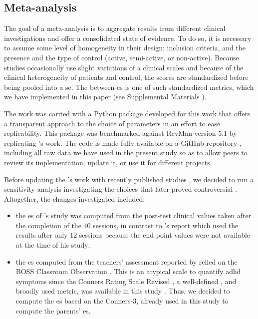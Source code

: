 \subsection{Meta-analysis}

The goal of a meta-analysis is to aggregate results from different clinical investigations and offer a 
consolidated state of evidence. To do so, it is necessary to assume 
some level of homogeneity in their design: inclusion criteria, and the presence and the type of control 
(active, semi-active, or non-active). Because studies occasionally 
use slight variations of a clinical scales and because of the clinical heterogeneity of patients and control, 
the scores are standardized before being pooled into a \gls{se}. The between-\gls{es} is one of such standardized metrics, 
which we have implemented in this paper (see Supplemental Materials \citep{Supplementalmaterial}). 

The work was carried with a Python package developed for this work that offers a transparent 
approach to the choice of parameters in an effort to ease replicability. This package was benchmarked against 
RevMan version 5.1 \citep[UK, London]{RevMan} by replicating \citet{Cortese2016}'s work. 
The code is made fully available on a GitHub repository \citep{Bussalb2018}, including all raw data we have used
in the present study so as to allow peers to review its implementation, update it, or use it for different projects. 
 
Before updating the \citet{Cortese2016}'s work with recently published studies
\citep{Strehl2017, Baumeister2016}, we decided to run a sensitivity analysis investigating the choices 
that later proved controversial \citep{Micoulaud2016}. Altogether, the changes investigated included:
\begin{itemize}
\item the \gls{es} of \citeauthor{Arnold2014}'s study was computed from the post-test clinical values taken 
after the completion of the 40 sessions, in contrast to \citet{Cortese2016}'s report which used the results 
after only 12 sessions because the end point values were not available at the time of his study;
\item the \gls{es} computed from the teachers' assessment reported by \citet{Steiner2014} relied on the BOSS 
Classroom Observation \citep{Shapiro2010}. This is an atypical scale to quantify \gls{adhd} symptoms since 
the Conners Rating Scale Revised \citep{Conners1998, Christiansen2014, Bluschke2016}, a well-defined
\citep{Collett2003, Epstein2012}, and broadly used metric, was available in this study . Thus, we decided 
to compute the \gls{es} based on the Conners-3, already used in this study to compute the 
parents' \gls{es}.  
\end{itemize} 

